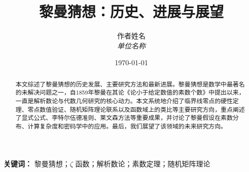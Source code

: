 \documentclass[12pt,a4paper]{article}
\title{黎曼猜想：历史、进展与展望}
\author{
    作者姓名\\
    \textit{单位名称}
}
\date{\today}
\numberwithin{equation}{section}
\begin{document}
\maketitle

\begin{abstract}
    本文综述了黎曼猜想的历史发展、主要研究方法和最新进展。黎曼猜想是数学中最著名的未解决问题之一，自1859年黎曼在其论《论小于给定数值的素数个数》中提出以来，一直是解析数论与代数几何研究的核心动力。本文系统地介绍了临界线零点的硬性定理、零点数值验证、随机矩阵理论联系以及函数域上的类比等主要研究方向，重点阐述了显式公式、李特尔伍德准则、莱文森方法等重要成果，并讨论了黎曼假设在素数分布、计算复杂度和密码学中的应用。最后，我们展望了该领域的未来研究方向。
\end{abstract}

\textbf{关键词：} 黎曼猜想；$\zeta$ 函数；解析数论；素数定理；随机矩阵理论

\tableofcontents
\newpage












\appendix

\end{document}
